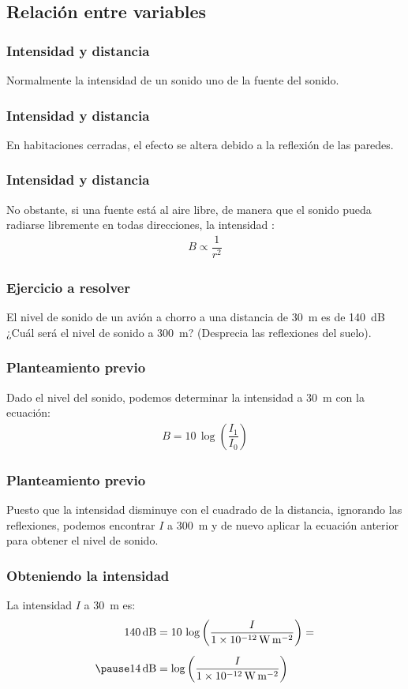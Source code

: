 \documentclass[14pt]{beamer}
\begin{document}
\subsection{Relación entre variables}

\begin{frame}
\frametitle{Intensidad y distancia}
Normalmente la intensidad de un sonido  uno de la fuente del
sonido.
\end{frame}
\begin{frame}
\frametitle{Intensidad y distancia}
En habitaciones cerradas, el efecto se altera debido a la reflexión de las paredes.
\end{frame}
\begin{frame}
\frametitle{Intensidad y distancia}
No obstante, si una fuente está al aire libre, de manera que el sonido pueda radiarse libremente en todas direcciones, \pause la intensidad :
\pause
\begin{align*}
B \propto \dfrac{1}{r^{2}}
\end{align*}
\end{frame}
\begin{frame}
\frametitle{Ejercicio a resolver}
El nivel de sonido de un avión a chorro a una distancia de \SI{30}{\meter} es de \SI{140}{\dB}
\\
\bigskip
\pause
¿Cuál será el nivel de sonido a \SI{300}{\meter}? (Desprecia las reflexiones del suelo).
\end{frame}
\begin{frame}
\frametitle{Planteamiento previo}
Dado el nivel del sonido, podemos determinar la intensidad a \SI{30}{\meter} con la ecuación:
\pause
\begin{align*}
B = 10 \,\log \left( \dfrac{I_{1}}{I_{0}} \right)
\end{align*}
\end{frame}
\begin{frame}
\frametitle{Planteamiento previo}
Puesto que la intensidad disminuye con el cuadrado de la distancia, ignorando las reflexiones, podemos encontrar $I$ a \SI{300}{\meter} \pause y de nuevo aplicar la ecuación anterior para obtener el nivel de sonido.
\end{frame}
\begin{frame}
\frametitle{Obteniendo la intensidad}
La intensidad $I$ a \SI{30}{\meter} es:
\pause
\begin{eqnarray*}
\begin{aligned}
\SI{140}{\dB} &= 10 \, \log \left( \dfrac{I}{\SI{1d-12}{\watt\per\square\meter}} \right) = \\[0.5em] \pause
\SI{14}{\dB} &= \log \left( \dfrac{I}{\SI{1d-12}{\watt\per\square\meter}} \right)
\end{aligned}
\end{eqnarray*}
\end{frame}
\end{document}
